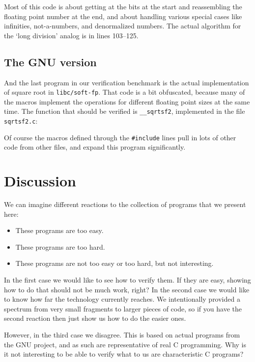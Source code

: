 \documentclass{article}
\begin{document}
Most of this code is about getting at the bits at the start and reassembling the
floating point number at the end, and about
handling various special cases like infinities, not-a-numbers, and
denormalized numbers.
The actual algorithm for the `long division' analog
is in lines 103--125.

\subsection{The GNU version}
And the last program in our verification benchmark is the actual implementation
of square root in \texttt{libc/soft-fp}.
That code is a bit obfuscated, because many of the macros implement the operations
for different floating point sizes at the same time.
The function that should be verified is \lstinline|__sqrtsf2|,
implemented in the file \lstinline|sqrtsf2.c|:

Of course the macros defined through the \lstinline|#include| lines pull in lots of other code from other files, and expand this program significantly.

\section{Discussion}
We can imagine different reactions to the collection of programs that we present here:
\begin{itemize}
\item
These programs are too easy.

\item
These programs are too hard.

\item
These programs are not too easy or too hard, but not interesting.

\end{itemize}
\noindent
In the first case we would like to see how to verify them.
If they are easy, showing how to do that should not be much work, right?
In the second case we would like to know how far the technology
currently reaches.
We intentionally provided a spectrum from very small fragments
to larger pieces of code, so if you have the second reaction then just show us how to do the easier ones.

However, in the third case we disagree.
This is based on actual programs from the GNU project,
and as such are representative of real C programming.
Why is it not interesting to be able to verify what
to us are characteristic C programs?
\end{document}

